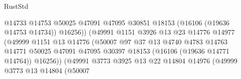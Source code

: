 \begin{lexlean}{RustStd}
\begin{coremodule}
                                                @14733
                                                @14753
                                                @50025
                                                @47091
                                                @47095
                                                @30851
                                                @18153
                                                (@16106 (@19636 @14753 @14734))
                                                @16256))
                                            (@49991
                                              @1151
                                              @3926
                                              @13
                                              @23
                                              @14776
                                              @14977
                                              (@49999
                                                @1151
                                                @13
                                                @14776
                                                (@50007
                                                  @97
                                                  @37
                                                  @13
                                                  @4740
                                                  @4783
                                                  @14763
                                                  @14771
                                                  @50025
                                                  @47091
                                                  @47095
                                                  @30397
                                                  @18153
                                                  (@16106 (@19636 @14771 @14764))
                                                  @16256))
                                              (@49991
                                                @3773
                                                @3925
                                                @13
                                                @22
                                                @14804
                                                @14976
                                                (@49999
                                                  @3773
                                                  @13
                                                  @14804
                                                  (@50007

\end{coremodule}
\end{lexlean}
